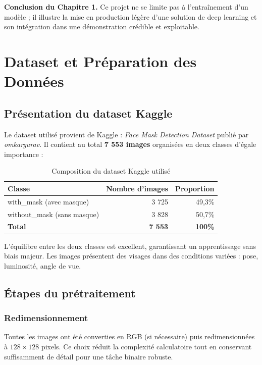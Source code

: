 \documentclass[11pt,a4paper]{article}
\begin{document}
\textbf{Conclusion du Chapitre 1.} Ce projet ne se limite pas à l'entraînement d'un modèle ; il illustre la mise en production légère d'une solution de deep learning et son intégration dans une démonstration crédible et exploitable.

\newpage
\section{Dataset et Préparation des Données}

\subsection{Présentation du dataset Kaggle}

Le dataset utilisé provient de Kaggle : \textit{Face Mask Detection Dataset} publié par \textit{omkargurav}. Il contient au total \textbf{7 553 images} organisées en deux classes d'égale importance :

\begin{table}[H]
\centering
\caption{Composition du dataset Kaggle utilisé}
\label{tab:dataset}
\begin{tabular}{lrr}
\toprule
\textbf{Classe} & \textbf{Nombre d'images} & \textbf{Proportion} \\
\midrule
with\_mask (avec masque) & 3 725 & 49,3\% \\
without\_mask (sans masque) & 3 828 & 50,7\% \\
\midrule
\textbf{Total} & \textbf{7 553} & \textbf{100\%} \\
\bottomrule
\end{tabular}
\end{table}

L'équilibre entre les deux classes est excellent, garantissant un apprentissage sans biais majeur. Les images présentent des visages dans des conditions variées : pose, luminosité, angle de vue.

\subsection{Étapes du prétraitement}

\subsubsection{Redimensionnement}
Toutes les images ont été converties en RGB (si nécessaire) puis redimensionnées à \(128 \times 128\) pixels. Ce choix réduit la complexité calculatoire tout en conservant suffisamment de détail pour une tâche binaire robuste.
\end{document}
